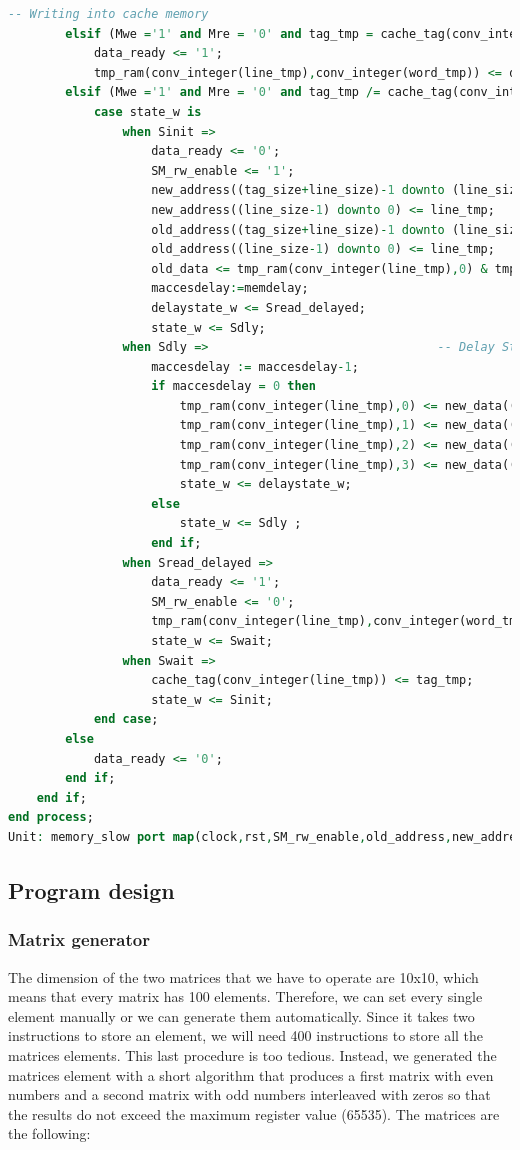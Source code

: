\documentclass[]{article}
\begin{document}
\begin{lstlisting}[language=vhdl, caption={Cache controller vhdl}, label={}]
		-- Writing into cache memory	
		elsif (Mwe ='1' and Mre = '0' and tag_tmp = cache_tag(conv_integer(line_tmp))) then
			data_ready <= '1';
			tmp_ram(conv_integer(line_tmp),conv_integer(word_tmp)) <= data_in;
		elsif (Mwe ='1' and Mre = '0' and tag_tmp /= cache_tag(conv_integer(line_tmp))) then		
			case state_w is
				when Sinit =>
					data_ready <= '0';
					SM_rw_enable <= '1';
					new_address((tag_size+line_size)-1 downto (line_size)) <= tag_tmp;
					new_address((line_size-1) downto 0) <= line_tmp;
					old_address((tag_size+line_size)-1 downto (line_size)) <= cache_tag(conv_integer(line_tmp));
					old_address((line_size-1) downto 0) <= line_tmp;
					old_data <= tmp_ram(conv_integer(line_tmp),0) & tmp_ram(conv_integer(line_tmp),1) & tmp_ram(conv_integer(line_tmp),2) & tmp_ram(conv_integer(line_tmp),3);
					maccesdelay:=memdelay;
					delaystate_w <= Sread_delayed;
					state_w <= Sdly;
				when Sdly =>								-- Delay State	
					maccesdelay := maccesdelay-1;
					if maccesdelay = 0 then 
						tmp_ram(conv_integer(line_tmp),0) <= new_data((data_width*(2**block_size))-1 downto (data_width*(2**block_size-1)));
						tmp_ram(conv_integer(line_tmp),1) <= new_data((data_width*(2**block_size-1))-1 downto (data_width*(2**block_size-2)));
						tmp_ram(conv_integer(line_tmp),2) <= new_data((data_width*(2**block_size-2))-1 downto (data_width*(2**block_size-3)));
						tmp_ram(conv_integer(line_tmp),3) <= new_data((data_width*(2**block_size-3))-1 downto 0);
						state_w <= delaystate_w;
					else 
						state_w <= Sdly ;
					end if;
				when Sread_delayed =>
					data_ready <= '1';
					SM_rw_enable <= '0';
					tmp_ram(conv_integer(line_tmp),conv_integer(word_tmp)) <= data_in;
					state_w <= Swait;
				when Swait =>
					cache_tag(conv_integer(line_tmp)) <= tag_tmp;
					state_w <= Sinit;
			end case;		
		else
			data_ready <= '0';		
		end if;
	end if;
end process;
Unit: memory_slow port map(clock,rst,SM_rw_enable,old_address,new_address,old_data,new_data);
\end{lstlisting}

\subsection{Program design}

\subsubsection{Matrix generator}
The dimension of the two matrices that we have to operate are 10x10, which means that every matrix has 100 elements. Therefore, we can set every single element manually or we can generate them automatically. Since it takes two instructions to store an element, we will need 400 instructions to store all the matrices elements. This last procedure is too tedious. Instead, we generated the matrices element with a short algorithm that produces a first matrix with even numbers and a second matrix with odd numbers interleaved with zeros so that the results do not exceed the maximum register value (65535). The matrices are the following:
\end{document}
